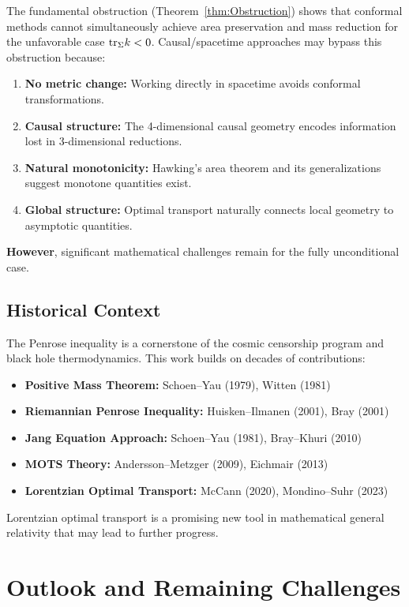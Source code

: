 The fundamental obstruction (Theorem~\ref{thm:Obstruction}) shows that conformal methods cannot simultaneously achieve area preservation and mass reduction for the unfavorable case $\mathrm{tr}_\Sigma k < 0$. Causal/spacetime approaches may bypass this obstruction because:

\begin{enumerate}
    \item \textbf{No metric change:} Working directly in spacetime avoids conformal transformations.
    \item \textbf{Causal structure:} The 4-dimensional causal geometry encodes information lost in 3-dimensional reductions.
    \item \textbf{Natural monotonicity:} Hawking's area theorem and its generalizations suggest monotone quantities exist.
    \item \textbf{Global structure:} Optimal transport naturally connects local geometry to asymptotic quantities.
\end{enumerate}

\textbf{However}, significant mathematical challenges remain for the fully unconditional case.

\subsection{Historical Context}

The Penrose inequality is a cornerstone of the cosmic censorship program and black hole thermodynamics. This work builds on decades of contributions:
\begin{itemize}
    \item \textbf{Positive Mass Theorem:} Schoen--Yau (1979), Witten (1981)
    \item \textbf{Riemannian Penrose Inequality:} Huisken--Ilmanen (2001), Bray (2001)
    \item \textbf{Jang Equation Approach:} Schoen--Yau (1981), Bray--Khuri (2010)
    \item \textbf{MOTS Theory:} Andersson--Metzger (2009), Eichmair (2013)
    \item \textbf{Lorentzian Optimal Transport:} McCann (2020), Mondino--Suhr (2023)
\end{itemize}

Lorentzian optimal transport is a promising new tool in mathematical general relativity that may lead to further progress.

\section{Outlook and Remaining Challenges}

